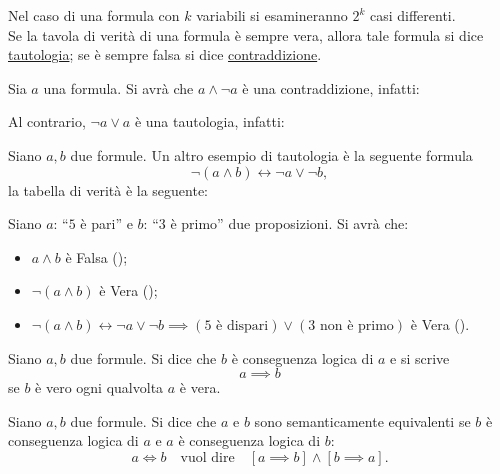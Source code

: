 

\noindent Nel caso di una formula con \(k\) variabili si esamineranno \(2^k\) casi differenti.\\

Se la tavola di verità di una formula è sempre vera, allora tale formula si dice \underline{tautologia}; se è sempre falsa si dice \underline{contraddizione}.
\newpage

\begin{example}
    Sia \(a\) una formula. Si avrà che \(a \land \neg a\) è una contraddizione, infatti:
    
    \noindent Al contrario, \(\neg a \lor a\) è una tautologia, infatti:
    
\end{example}

\begin{example}
    Siano \(a, b\) due formule. Un altro esempio di tautologia è la seguente formula
    \[
        \neg(a \land b) \longleftrightarrow \neg a \lor \neg b,
    \]
    la tabella di verità è la seguente:
    
\end{example}

\begin{example}
    Siano \(a\): ``\(5\) è pari'' e \(b\): ``\(3\) è primo'' due proposizioni. Si avrà che:
    \begin{itemize}
        \item \(a \land b\) è Falsa (\false);
        \item \(\neg(a \land b)\) è Vera (\true);
        \item \(\neg(a \land b) \longleftrightarrow \neg a \lor \neg b \implies (5 \text{ è dispari}) \lor (3 \text{ non è primo})\) è Vera (\true).
    \end{itemize}
\end{example}

\begin{definition}\label{def:implicazione_logica}
    Siano \(a, b\) due formule. Si dice che \(b\) è conseguenza logica di \(a\) e si scrive
    \[
        a \implies b
    \]
    se \(b\) è vero ogni qualvolta \(a\) è vera.
\end{definition}

\begin{definition}\label{def:semanticamente_equivalenti}
    Siano \(a, b\) due formule. Si dice che \(a\) e \(b\) sono semanticamente equivalenti se \(b\) è conseguenza logica di \(a\) e \(a\) è conseguenza logica di \(b\):
    \[
        a \iff b \quad\text{vuol dire}\quad [a \implies b] \land [b \implies a].
    \]
\end{definition}

